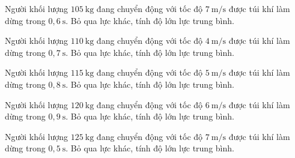 \begin{ex}
Người khối lượng $105\ \mathrm{kg}$ đang chuyển động với tốc độ $7\ \mathrm{m/s}$ được túi khí làm dừng trong $0,6\ \mathrm{s}$. Bỏ qua lực khác, tính độ lớn lực trung bình.
\end{ex}

\begin{ex}
Người khối lượng $110\ \mathrm{kg}$ đang chuyển động với tốc độ $4\ \mathrm{m/s}$ được túi khí làm dừng trong $0,7\ \mathrm{s}$. Bỏ qua lực khác, tính độ lớn lực trung bình.
\end{ex}

\begin{ex}
Người khối lượng $115\ \mathrm{kg}$ đang chuyển động với tốc độ $5\ \mathrm{m/s}$ được túi khí làm dừng trong $0,8\ \mathrm{s}$. Bỏ qua lực khác, tính độ lớn lực trung bình.
\end{ex}

\begin{ex}
Người khối lượng $120\ \mathrm{kg}$ đang chuyển động với tốc độ $6\ \mathrm{m/s}$ được túi khí làm dừng trong $0,9\ \mathrm{s}$. Bỏ qua lực khác, tính độ lớn lực trung bình.
\end{ex}

\begin{ex}
Người khối lượng $125\ \mathrm{kg}$ đang chuyển động với tốc độ $7\ \mathrm{m/s}$ được túi khí làm dừng trong $0,5\ \mathrm{s}$. Bỏ qua lực khác, tính độ lớn lực trung bình.
\end{ex}

